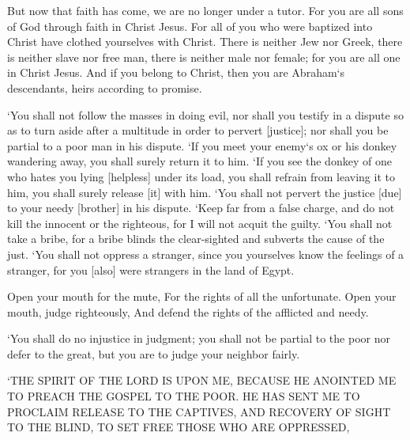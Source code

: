 \begin{scripture}[Galatians 3:25-30]
    But now that faith has come, we are no longer under a tutor.
    For you are all sons of God through faith in Christ Jesus.
    For all of you who were baptized into Christ have clothed yourselves with Christ.
    There is neither Jew nor Greek, there is neither slave nor free man, there is neither male nor female; for you are all one in Christ Jesus.
    And if you belong to Christ, then you are Abraham`s descendants, heirs according to promise.
\end{scripture}

\begin{scripture}[Exodus 23:2-9]
    `You shall not follow the masses in doing evil, nor shall you testify in a dispute so as to turn aside after a multitude in order to pervert [justice];
    nor shall you be partial to a poor man in his dispute.
    `If you meet your enemy`s ox or his donkey wandering away, you shall surely return it to him.
    `If you see the donkey of one who hates you lying [helpless] under its load, you shall refrain from leaving it to him, you shall surely release [it] with him.
    `You shall not pervert the justice [due] to your needy [brother] in his dispute.
    `Keep far from a false charge, and do not kill the innocent or the righteous, for I will not acquit the guilty.
    `You shall not take a bribe, for a bribe blinds the clear-sighted and subverts the cause of the just.
    `You shall not oppress a stranger, since you yourselves know the feelings of a stranger, for you [also] were strangers in the land of Egypt.
\end{scripture}

\begin{scripture}[Proverbs 31:8-9]
    Open your mouth for the mute, For the rights of all the unfortunate.
    Open your mouth, judge righteously, And defend the rights of the afflicted and needy.
\end{scripture}

\begin{scripture}[Leviticus 19:15]
    `You shall do no injustice in judgment; you shall not be partial to the poor nor defer to the great, but you are to judge your neighbor fairly.
\end{scripture}

\begin{scripture}[Luke 4:18]
    `THE SPIRIT OF THE LORD IS UPON ME, BECAUSE HE ANOINTED ME TO PREACH THE GOSPEL TO THE POOR. HE HAS SENT ME TO PROCLAIM RELEASE TO THE CAPTIVES, AND RECOVERY OF SIGHT TO THE BLIND, TO SET FREE THOSE WHO ARE OPPRESSED,
\end{scripture}


